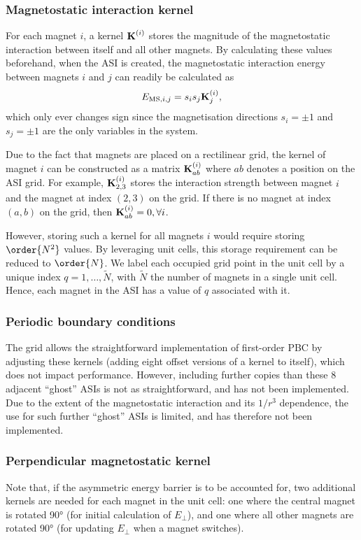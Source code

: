 \subsubsection{Magnetostatic interaction kernel}
For each magnet $i$, a kernel $\boldsymbol{\mathbf{K}}^{(i)}$ stores the magnitude of the magnetostatic interaction between itself and all other magnets.
By calculating these values beforehand, when the ASI is created, the magnetostatic interaction energy between magnets $i$ and $j$ can readily be calculated as
\begin{equation}
	E_{\mathrm{MS},i,j}= s_i s_j \boldsymbol{\mathbf{K}}^{(i)}_j \mathrm{,}
\end{equation}
which only ever changes sign since the magnetisation directions $s_i = \pm 1$ and $s_j = \pm 1$ are the only variables in the system. \par
Due to the fact that magnets are placed on a rectilinear grid, the kernel of magnet $i$ can be constructed as a matrix $\boldsymbol{\mathbf{K}}^{(i)}_{ab}$ where $ab$ denotes a position on the ASI grid.
For example, $\boldsymbol{\mathbf{K}}^{(i)}_{2,3}$ stores the interaction strength between magnet $i$ and the magnet at index $(2,3)$ on the grid.
If there is no magnet at index $(a,b)$ on the grid, then $\boldsymbol{\mathbf{K}}^{(i)}_{ab} = 0, \forall i$. \par
However, storing such a kernel for all magnets $i$ would require storing $\order{N^2}$ values.
By leveraging unit cells, this storage requirement can be reduced to $\order{N}$.
We label each occupied grid point in the unit cell by a unique index $q = 1,\dots,\widetilde{N}$, with $\widetilde{N}$ the number of magnets in a single unit cell.
Hence, each magnet in the ASI has a value of $q$ associated with it.

\subsubsection{Periodic boundary conditions}
The grid allows the straightforward implementation of first-order PBC by adjusting these kernels (adding eight offset versions of a kernel to itself), which does not impact performance. %
However, including further copies than these 8 adjacent ``ghost'' ASIs is not as straightforward, and has not been implemented. Due to the extent of the magnetostatic interaction and its $1/r^3$ dependence, the use for such further ``ghost'' ASIs is limited, and has therefore not been implemented.
\subsubsection{Perpendicular magnetostatic kernel} %
Note that, if the asymmetric energy barrier is to be accounted for, two additional kernels are needed for each magnet in the unit cell: one where the central magnet is rotated \ang{90} (for initial calculation of $E_\perp$), and one where all other magnets are rotated \ang{90} (for updating $E_\perp$ when a magnet switches). \par
